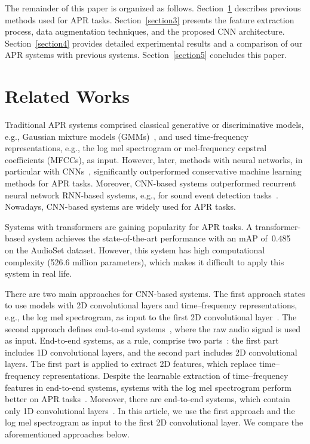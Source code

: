 \documentclass{article}
\begin{document}
\begin{sloppy}
The remainder of this paper is organized as follows. Section~\ref{section2} describes previous methods used for APR tasks. Section~\ref{section3} presents the feature extraction process, data augmentation techniques, and the proposed CNN architecture. Section~\ref{section4} provides detailed experimental results and a comparison of our APR systems with previous systems. Section~\ref{section5} concludes this paper.


\section{Related Works}
\label{section2}

Traditional APR systems comprised classical generative or discriminative models, e.g., Gaussian mixture models (GMMs)~\cite{Vuegen2013ANMA}, and used time-frequency representations, e.g., the log mel spectrogram or mel-frequency cepstral coefficients (MFCCs), as input. However, later, methods with neural networks, in particular with CNNs~\cite{tokozume2018learning, 9229505,9414229, 9413035, Guzhov2021ESResNeXtfbspLR}, significantly outperformed conservative machine learning methods for APR tasks. Moreover, CNN-based systems outperformed recurrent neural network RNN-based systems, e.g., for sound event detection tasks~\cite{rnn_comparison}. Nowadays, \hbox{CNN-based} systems are widely used for APR tasks.

Systems with transformers are gaining popularity for APR tasks. A transformer-based system achieves the state-of-the-art performance with an mAP of~0.485~\cite{gong21b_interspeech} on the AudioSet dataset. However, this system has high computational complexity (526.6 million parameters), which makes it difficult to apply this system in real life.

There are two main approaches for CNN-based systems. The first approach states to use models with 2D convolutional layers and time--frequency representations, e.g., the log mel spectrogram, as input to the first 2D convolutional layer~\cite{9229505, 9413035}. The second approach defines end-to-end systems~\cite{9229505, 9414229, ABDOLI2019252, tokozume2018learning}, where the raw audio signal is used as input. End-to-end systems, as a rule, comprise two parts~\cite{9229505, 9414229, tokozume2018learning}: the first part includes 1D convolutional layers, and the second part includes 2D convolutional layers. The first part is applied to extract 2D features, which replace \hbox{time--frequency} representations. Despite the learnable extraction of \hbox{time--frequency} features in end-to-end systems, systems with the log mel spectrogram perform better on APR tasks~\cite{9229505, 9414229}. Moreover, there are end-to-end systems, which contain only 1D convolutional layers~\cite{ABDOLI2019252}. In this article, we use the first approach and the log mel spectrogram as input to the first 2D convolutional layer. We compare the aforementioned approaches below.


\end{sloppy}
\end{document}
